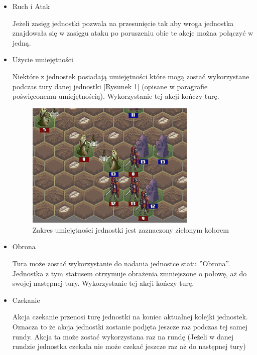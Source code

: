 \documentclass[letterpaper,12pt]{article}
\begin{document}
\begin{itemize}
\item Ruch i Atak
\par Jeżeli zasięg jednostki pozwala na przesunięcie tak aby wroga jednostka znajdowała się w zasięgu ataku po poruszeniu obie te akcje można połączyć w jedną.
\item Użycie umiejętności 
\par Niektóre z jednostek posiadają umiejętności które mogą zostać wykorzystane podczas tury danej jednostki  [Rysunek \ref{fig:abilityRange}] (opisane w paragrafie poświęconemu umiejętnością). Wykorzystanie tej akcji kończy turę. 

\begin{figure}[H]
 \centering
  \includegraphics[width=3.2in]{abilityRange.png}
  \caption{Zakres umiejętności jednostki jest zaznaczony zielonym kolorem}
  \label{fig:abilityRange}
\end{figure}

\item Obrona
\par Tura może zostać wykorzystanie do nadania jednostce statu ''Obrona''. Jednostka z tym statusem otrzymuje obrażenia zmniejszone o połowę, aż do swojej następnej tury. Wykorzystanie tej akcji kończy turę. 
\item Czekanie
\par Akcja czekanie przenosi turę jednostki na koniec aktualnej kolejki jednostek. Oznacza to że akcja jednostki zostanie podjęta jeszcze raz podczas tej samej rundy. Akcja ta może zostać wykorzystana raz na rundę (Jeżeli w danej rundzie jednostka czekała nie może czekać jeszcze raz aż do następnej tury) 
\end{itemize}
\end{document}
